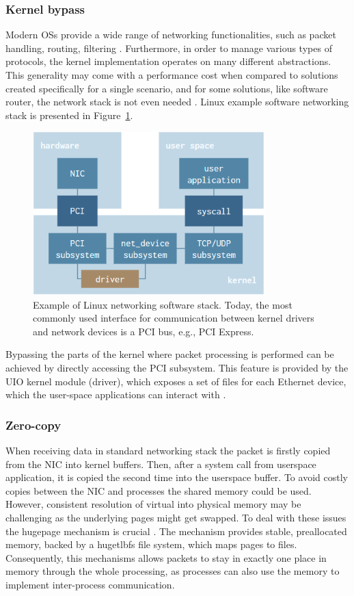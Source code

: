 \documentclass[english]{kththesis}
\begin{document}
\subsubsection{Kernel bypass}
Modern \glspl{OS} provide a wide range of networking functionalities, such as packet handling, routing, filtering \cite{packet_receiving_2007}. Furthermore, in order to manage various types of protocols, the kernel implementation operates on many different abstractions. This generality may come with a performance cost when compared to solutions created specifically for a single scenario, and for some solutions, like software router, the network stack is not even needed \cite{barbette_2015}. Linux example software networking stack is presented in Figure~\ref{fig:softstack}.
\begin{figure}[!ht]
  \begin{center}
    \includegraphics[width=0.8\textwidth]{Fig4}
  \end{center}
  \caption{Example of Linux networking software stack. Today, the most commonly used interface for communication between kernel drivers and network devices is a PCI bus, e.g., PCI Express.}
  \label{fig:softstack}
\end{figure}
Bypassing the parts of the kernel where packet processing is performed can be achieved by directly accessing the PCI subsystem. This feature is provided by the \gls{UIO} kernel module (driver), which exposes a set of files for each Ethernet device, which the user-space applications can interact with \cite{codilime}.

\subsubsection{Zero-copy}
When receiving data in standard networking stack the packet is firstly copied from the \gls{NIC} into kernel buffers. Then, after a system call from userspace application, it is copied the second time into the userspace buffer. To avoid costly copies between the \gls{NIC} and processes the shared memory could be used. However, consistent resolution of virtual into physical memory may be challenging as the underlying pages might get swapped. To deal with these issues the hugepage mechanism is crucial \cite{hugepages}. The mechanism provides stable, preallocated memory, backed by a hugetlbfs file system, which maps pages to files. Consequently, this mechanisms allows packets to stay in exactly one place in memory through the whole processing, as processes can also use the memory to implement inter-process communication.
\end{document}
